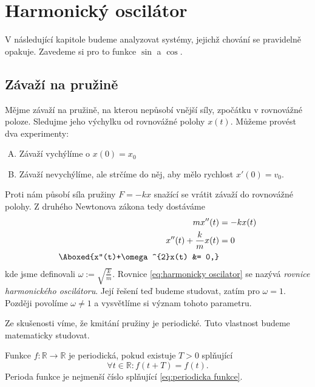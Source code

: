 \chapter{Harmonický oscilátor}
V následující kapitole budeme analyzovat systémy, jejichž chování se pravidelně opakuje. Zavedeme si pro to funkce $\sin$ a $\cos$.
\section{Závaží na pružině}
Mějme závaží na pružině, na kterou nepůsobí vnější síly, zpočátku v rovnovážné poloze. Sledujme jeho výchylku od rovnovážné polohy $x(t)$. Můžeme provést dva experimenty:
\begin{enumerate}[(A)]
	\item Závaží vychýlíme o $x(0)=x_0$
	\item Závaží nevychýlíme, ale strčíme do něj, aby mělo rychlost $x'(0)=v_0.$
\end{enumerate}
Proti nám působí síla pružiny $F=-kx$ snažící se vrátit závaží do rovnovážné polohy. Z druhého Newtonova zákona tedy dostáváme
\begin{align}
	mx''(t) &= -kx(t)\notag \\
	x''(t)+\frac{k}{m}x(t) &= 0\notag \\
	\Aboxed{x''(t)+\omega^{2}x(t) &= 0,}\label{eq:harmonicky oscilator}
\end{align}
kde jsme definovali $\omega:=\sqrt{\frac{k}{m}}$. Rovnice \ref{eq:harmonicky oscilator} se nazývá \emph{rovnice harmonického oscilátoru}. Její řešení teď budeme studovat, zatím pro $\omega=1$. Později povolíme $\omega\neq 1$ a vysvětlíme si význam tohoto parametru.

Ze skušenosti víme, že kmitání pružiny je periodické. Tuto vlastnost budeme matematicky studovat.
\begin{definice}
  Funkce $f\colon \mathbb{R}\to \mathbb{R}$ je periodická, pokud existuje $T>0$ splňující
  \begin{equation}\label{eq:periodicka funkce}
    \forall t\in \mathbb{R}\colon f(t+T)=f(t).
  \end{equation}
  Perioda funkce je nejmenší číslo splňující \ref{eq:periodicka funkce}.
\end{definice}
